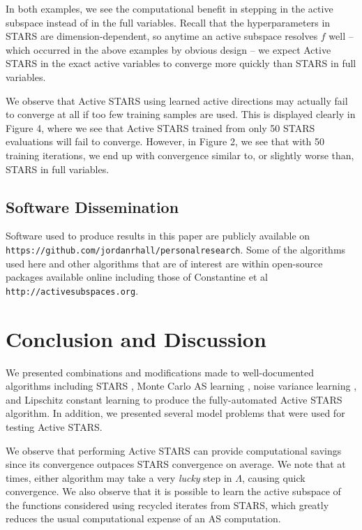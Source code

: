 \documentclass{amsart}
\begin{document}
In both examples, we see the computational benefit in stepping in the active subspace instead of in the full variables. Recall that the hyperparameters in STARS are dimension-dependent, so anytime an active subspace resolves $f$ well -- which occurred in the above examples by obvious design -- we expect Active STARS in the exact active variables to converge more quickly than STARS in full variables.  

We observe that Active STARS using learned active directions may actually fail to converge at all if too few training samples are used. This is displayed clearly in Figure 4, where we see that Active STARS trained from only 50 STARS evaluations will fail to converge. However, in Figure 2, we see that with 50 training iterations, we end up with convergence similar to, or slightly worse than, STARS in full variables.






\subsection{Software Dissemination}

Software used to produce results in this paper are publicly available on \texttt{https://github.com/jordanrhall/personalresearch}. Some of the algorithms used here and other algorithms that are of interest are within open-source packages available online including those of Constantine et al
\texttt{http://activesubspaces.org}.


\section{Conclusion and Discussion} \label{s:Conc}

We presented combinations and modifications made to well-documented algorithms including STARS \cite{CW}, Monte Carlo AS learning \cite{ConstantineMC}, noise variance learning \cite{MW}, and Lipschitz constant learning \cite{Calliess} to produce the fully-automated Active STARS algorithm. In addition, we presented several model  problems that were used for testing Active STARS.

We observe  %
that performing Active STARS can provide computational savings since its convergence outpaces STARS convergence on average. We note that at times, either algorithm may take a very \textit{lucky} step in $\Lambda$, causing quick convergence. We also observe that it is possible to learn the active subspace of the functions considered using recycled iterates from STARS, which greatly reduces the usual computational expense of an AS computation.
\end{document}
